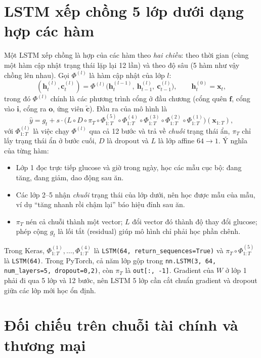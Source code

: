 \section{LSTM xếp chồng 5 lớp dưới dạng hợp các hàm}
\label{sec:ch4-compose}

Một LSTM xếp chồng là hợp của các hàm theo \emph{hai chiều}: theo thời gian (cùng một hàm cập nhật trạng thái lặp lại 12 lần) và theo độ sâu (5 hàm như vậy chồng lên nhau). Gọi $\Phi^{(l)}$ là hàm cập nhật của lớp $l$:
\begin{equation}
(\mathbf h^{(l)}_t, \mathbf c^{(l)}_t) = \Phi^{(l)}\big(\mathbf h^{(l-1)}_t,\ \mathbf h^{(l)}_{t-1},\ \mathbf c^{(l)}_{t-1}\big), \qquad \mathbf h^{(0)}_t = \mathbf x_t ,
\end{equation}
trong đó $\Phi^{(l)}$ chính là các phương trình cổng ở đầu chương (cổng quên $\mathbf f$, cổng vào $\mathbf i$, cổng ra $\mathbf o$, ứng viên $\tilde{\mathbf c}$). Đầu ra của mô hình là
\begin{equation}
\hat y = g_t + s\cdot \big(L \circ D \circ \pi_T \circ \Phi^{(5)}_{1:T} \circ \Phi^{(4)}_{1:T} \circ \Phi^{(3)}_{1:T} \circ \Phi^{(2)}_{1:T} \circ \Phi^{(1)}_{1:T}\big)(\mathbf x_{1:T}),
\end{equation}
với $\Phi^{(l)}_{1:T}$ là việc chạy $\Phi^{(l)}$ qua cả 12 bước và trả về \emph{chuỗi} trạng thái ẩn, $\pi_T$ chỉ lấy trạng thái ẩn ở bước cuối, $D$ là dropout và $L$ là lớp affine $64\to1$. Ý nghĩa của từng hàm:
\begin{itemize}
  \item Lớp 1 đọc trực tiếp glucose và giờ trong ngày, học các mẫu cục bộ: đang tăng, đang giảm, dao động sau ăn.
  \item Các lớp 2–5 nhận \emph{chuỗi} trạng thái của lớp dưới, nên học được mẫu của mẫu, ví dụ ``tăng nhanh rồi chậm lại'' báo hiệu đỉnh sau ăn.
  \item $\pi_T$ nén cả chuỗi thành một vector; $L$ đổi vector đó thành độ thay đổi glucose; phép cộng $g_t$ là lối tắt (residual) giúp mô hình chỉ phải học phần chênh.
\end{itemize}
Trong Keras, $\Phi^{(1)}_{1:T},\dots,\Phi^{(4)}_{1:T}$ là \texttt{LSTM(64, return\_sequences=True)} và $\pi_T\circ\Phi^{(5)}_{1:T}$ là \texttt{LSTM(64)}. Trong PyTorch, cả năm lớp gộp trong \texttt{nn.LSTM(3, 64, num\_layers=5, dropout=0,2)}, còn $\pi_T$ là \texttt{out[:, -1]}. Gradient của $W$ ở lớp 1 phải đi qua 5 lớp và 12 bước, nên LSTM 5 lớp cần cắt chuẩn gradient và dropout giữa các lớp mới học ổn định.

\section{Đối chiếu trên chuỗi tài chính và thương mại}
\label{sec:ch4-domains}

